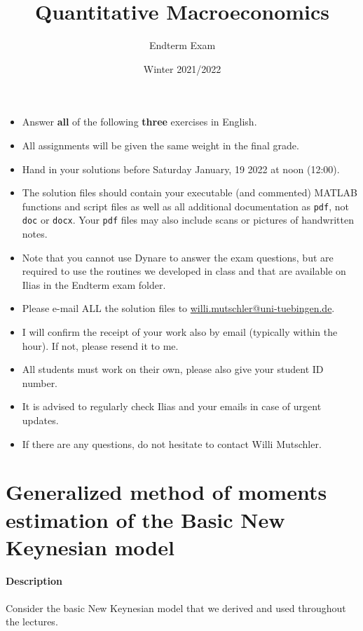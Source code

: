 \documentclass{article}
\begin{document}
	
	\title{Quantitative Macroeconomics}
	\author{Endterm Exam}
	\date{Winter 2021/2022}
	\maketitle
	
	\begin{itemize}
		\item Answer \textbf{all} of the following \textbf{three} exercises in English.
		\item All assignments will be given the same weight in the final grade.
		\item Hand in your solutions before Saturday January, 19 2022 at noon (12:00).
		\item The solution files should contain your executable (and commented) MATLAB functions and script files as well as all additional documentation as \texttt{pdf}, not \texttt{doc} or \texttt{docx}. Your \texttt{pdf} files may also include scans or pictures of handwritten notes. 
		\item Note that you cannot use Dynare to answer the exam questions, but are required to use the routines we developed in class and that are available on Ilias in the Endterm exam folder.
		\item Please e-mail ALL the solution files to \url{willi.mutschler@uni-tuebingen.de}.
		\item I will confirm the receipt of your work also by email (typically within the hour). If not, please resend it to me.		
		\item All students must work on their own, please also give your student ID number.		
		\item It is advised to regularly check Ilias and your emails in case of urgent updates.
		\item If there are any questions, do not hesitate to contact Willi Mutschler.
	\end{itemize}
	\newpage



\section[Generalized method of moments estimation of the Basic New Keynesian model]{Generalized method of moments estimation of the Basic New Keynesian model\label{ex:BasicNewKeynesianModelGMM}}
\paragraph{Description}
Consider the basic New Keynesian model that we derived and used throughout the lectures.
\end{document}
